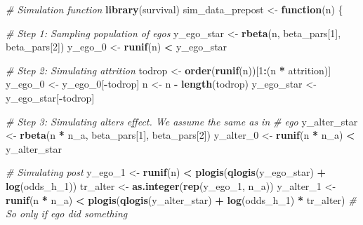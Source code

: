 \documentclass[
]{book}
\newenvironment{Shaded}{\begin{snugshade}}{\end{snugshade}}
\newcommand{\CommentTok}[1]{\textcolor[rgb]{0.56,0.35,0.01}{\textit{#1}}}
\newcommand{\ControlFlowTok}[1]{\textcolor[rgb]{0.13,0.29,0.53}{\textbf{#1}}}
\newcommand{\DecValTok}[1]{\textcolor[rgb]{0.00,0.00,0.81}{#1}}
\newcommand{\FunctionTok}[1]{\textcolor[rgb]{0.13,0.29,0.53}{\textbf{#1}}}
\newcommand{\NormalTok}[1]{#1}
\newcommand{\OtherTok}[1]{\textcolor[rgb]{0.56,0.35,0.01}{#1}}
\newcommand{\SpecialCharTok}[1]{\textcolor[rgb]{0.81,0.36,0.00}{\textbf{#1}}}
\begin{document}
\begin{Shaded}
\begin{Highlighting}[]
\CommentTok{\# Simulation function}
\FunctionTok{library}\NormalTok{(survival)}
\NormalTok{sim\_data\_prepost }\OtherTok{\textless{}{-}} \ControlFlowTok{function}\NormalTok{(n) \{}


  \CommentTok{\# Step 1: Sampling population of egos}
\NormalTok{  y\_ego\_star }\OtherTok{\textless{}{-}} \FunctionTok{rbeta}\NormalTok{(n, beta\_pars[}\DecValTok{1}\NormalTok{], beta\_pars[}\DecValTok{2}\NormalTok{])}
\NormalTok{  y\_ego\_0    }\OtherTok{\textless{}{-}} \FunctionTok{runif}\NormalTok{(n) }\SpecialCharTok{\textless{}}\NormalTok{ y\_ego\_star}

  \CommentTok{\# Step 2: Simulating attrition}
\NormalTok{  todrop     }\OtherTok{\textless{}{-}} \FunctionTok{order}\NormalTok{(}\FunctionTok{runif}\NormalTok{(n))[}\DecValTok{1}\SpecialCharTok{:}\NormalTok{(n }\SpecialCharTok{*}\NormalTok{ attrition)]}
\NormalTok{  y\_ego\_0    }\OtherTok{\textless{}{-}}\NormalTok{ y\_ego\_0[}\SpecialCharTok{{-}}\NormalTok{todrop]}
\NormalTok{  n          }\OtherTok{\textless{}{-}}\NormalTok{ n }\SpecialCharTok{{-}} \FunctionTok{length}\NormalTok{(todrop)}
\NormalTok{  y\_ego\_star }\OtherTok{\textless{}{-}}\NormalTok{ y\_ego\_star[}\SpecialCharTok{{-}}\NormalTok{todrop]}

  \CommentTok{\# Step 3: Simulating alter\textquotesingle{}s effect. We assume the same as in}
  \CommentTok{\# ego}
\NormalTok{  y\_alter\_star }\OtherTok{\textless{}{-}} \FunctionTok{rbeta}\NormalTok{(n }\SpecialCharTok{*}\NormalTok{ n\_a, beta\_pars[}\DecValTok{1}\NormalTok{], beta\_pars[}\DecValTok{2}\NormalTok{])}
\NormalTok{  y\_alter\_0    }\OtherTok{\textless{}{-}} \FunctionTok{runif}\NormalTok{(n }\SpecialCharTok{*}\NormalTok{ n\_a) }\SpecialCharTok{\textless{}}\NormalTok{ y\_alter\_star}

  \CommentTok{\# Simulating post}
\NormalTok{  y\_ego\_1   }\OtherTok{\textless{}{-}} \FunctionTok{runif}\NormalTok{(n) }\SpecialCharTok{\textless{}} \FunctionTok{plogis}\NormalTok{(}\FunctionTok{qlogis}\NormalTok{(y\_ego\_star) }\SpecialCharTok{+} \FunctionTok{log}\NormalTok{(odds\_h\_1))}
\NormalTok{  tr\_alter  }\OtherTok{\textless{}{-}} \FunctionTok{as.integer}\NormalTok{(}\FunctionTok{rep}\NormalTok{(y\_ego\_1, n\_a))}
\NormalTok{  y\_alter\_1 }\OtherTok{\textless{}{-}} \FunctionTok{runif}\NormalTok{(n }\SpecialCharTok{*}\NormalTok{ n\_a) }\SpecialCharTok{\textless{}} \FunctionTok{plogis}\NormalTok{(}\FunctionTok{qlogis}\NormalTok{(y\_alter\_star) }\SpecialCharTok{+} \FunctionTok{log}\NormalTok{(odds\_h\_1) }\SpecialCharTok{*}\NormalTok{ tr\_alter) }\CommentTok{\# So only if ego did something}


\end{Highlighting}
\end{Shaded}
\end{document}

